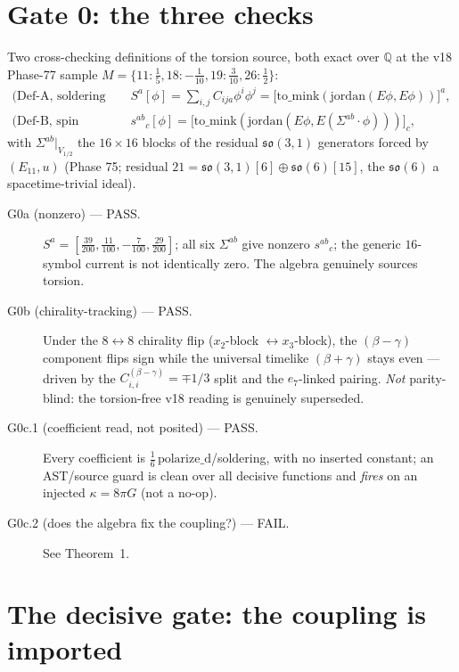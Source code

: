 \documentclass[11pt]{article}
\newcommand{\so}{\mathfrak{so}}
\begin{document}
\section{Gate 0: the three checks}

Two cross-checking definitions of the torsion source, both exact over $\mathbb{Q}$ at
the v18 Phase-77 sample $M=\{11{:}\tfrac15,18{:}-\tfrac1{10},19{:}\tfrac3{10},
26{:}\tfrac12\}$:
\begin{align}
\text{(Def-A, soldering current)}\quad & S^a[\phi]=\textstyle\sum_{i,j}C_{ija}\phi^i\phi^j
   =\big[\mathrm{to\_mink}(\mathrm{jordan}(E\phi,E\phi))\big]^a,\\
\text{(Def-B, spin tensor)}\quad & s^{ab}{}_c[\phi]
   =\big[\mathrm{to\_mink}(\mathrm{jordan}(E\phi,E(\Sigma^{ab}\!\cdot\phi)))\big]_c,
\end{align}
with $\Sigma^{ab}|_{V_{1/2}}$ the $16{\times}16$ blocks of the residual $\so(3,1)$
generators forced by $(E_{11},u)$ (Phase 75; residual
$21=\so(3,1)[6]\oplus\so(6)[15]$, the $\so(6)$ a spacetime-trivial ideal).

\begin{description}
\item[G0a (nonzero) --- PASS.] $S^a=[\tfrac{39}{200},\tfrac{11}{100},-\tfrac{7}{100},
\tfrac{29}{200}]$; all six $\Sigma^{ab}$ give nonzero $s^{ab}{}_c$; the generic
$16$-symbol current is not identically zero. The algebra genuinely sources torsion.
\item[G0b (chirality-tracking) --- PASS.] Under the $8\!\leftrightarrow\!8$ chirality
flip ($x_2$-block $\leftrightarrow x_3$-block), the $(\beta{-}\gamma)$ component flips
sign while the universal timelike $(\beta{+}\gamma)$ stays even --- driven by the
$C_{i,i}^{(\beta-\gamma)}=\mp1/3$ split and the $e_7$-linked pairing. \emph{Not}
parity-blind: the torsion-free v18 reading is genuinely superseded.
\item[G0c.1 (coefficient read, not posited) --- PASS.] Every coefficient is
$\tfrac16\,\mathrm{polarize\_d}$/soldering, with no inserted constant; an AST/source
guard is clean over all decisive functions and \emph{fires} on an injected
$\kappa=8\pi G$ (not a no-op).
\item[G0c.2 (does the algebra fix the coupling?) --- FAIL.] See Theorem~1.
\end{description}

\section{The decisive gate: the coupling is imported}
\end{document}

